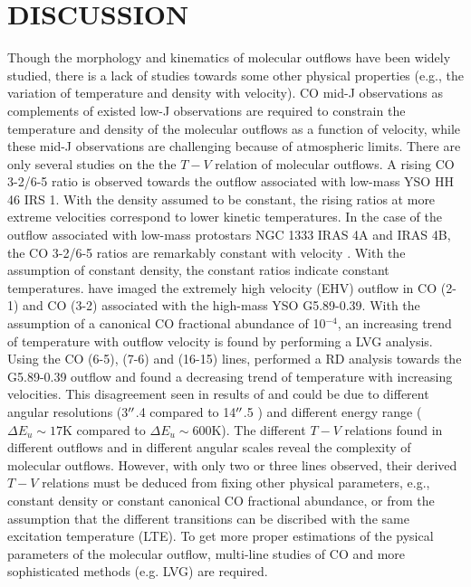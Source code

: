 \section{DISCUSSION}\label{discussion}

Though the morphology and kinematics of molecular outflows have been widely studied, there is a lack of studies towards some other physical properties (e.g., the variation of temperature and density with velocity). CO mid-J observations as complements of existed low-J observations are required to constrain the temperature and density of the molecular outflows as a function of velocity, while these mid-J observations are challenging because of atmospheric limits. There are only several studies on the the $T-V$ relation of molecular outflows. A rising CO 3-2/6-5 ratio is observed towards the outflow associated with low-mass YSO HH 46 IRS 1\citep{2009A&A...501..633V}. With the density assumed to be constant, the rising ratios at more extreme velocities correspond to lower kinetic temperatures. In the case of the outflow associated with low-mass protostars NGC 1333 IRAS 4A and  IRAS 4B, the CO 3-2/6-5 ratios are remarkably constant with velocity \citep{2012A&A...542A..86Y}. With the assumption of constant density, the constant ratios indicate constant temperatures. \citet{2012ApJ...744L..26S} have imaged the extremely high velocity (EHV) outflow in CO (2-1) and CO (3-2) associated with the high-mass YSO G5.89-0.39. With the assumption of a canonical CO fractional abundance of 10$^{-4}$, an increasing trend of temperature with outflow velocity is found by performing a LVG analysis. Using the CO (6-5), (7-6) and (16-15) lines, \citet{2015A&A...584A..70L} performed a RD analysis towards the G5.89-0.39 outflow and found a decreasing trend of temperature with increasing velocities. This disagreement seen in results of \citet{2012ApJ...744L..26S} and \citet{2015A&A...584A..70L} could be due to different angular resolutions (3${\mbox{$^{\prime\prime}$}}$.4 compared to 14${\mbox{$^{\prime\prime}$}}$.5 ) and different energy range ($\Delta E_u \sim 17 $K compared to $\Delta E_u \sim 600 $K). The different $T-V$ relations found in different outflows and in different angular scales reveal the complexity of molecular outflows. However, with only two or three lines observed, their derived $T-V$ relations must be deduced from fixing other physical parameters, e.g., constant density or constant canonical CO fractional abundance, or from the assumption that the different transitions can be discribed with the same excitation temperature (LTE). To get more proper estimations of the pysical parameters of the molecular outflow, multi-line studies of CO and more sophisticated methods (e.g. LVG) are required.

